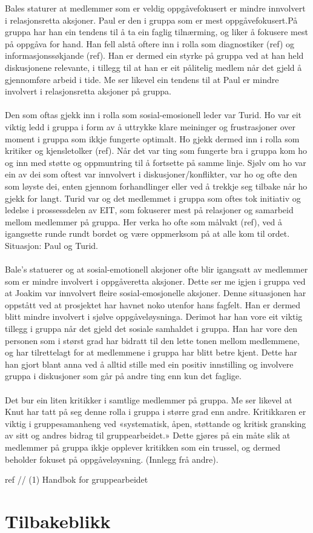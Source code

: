 Bales staturer at medlemmer som er veldig oppgåvefokusert er mindre innvolvert i relasjonsretta aksjoner. Paul er den i gruppa som er mest oppgåvefokusert.På gruppa har han ein tendens til å ta ein faglig tilnærming, og liker å fokusere mest på oppgåva for hand. Han fell alstå oftere inn i rolla som diagnostiker (ref) og informasjonssøkjande (ref). Han er dermed ein styrke på gruppa ved at han held diskusjonene relevante, i tillegg til at han er eit pålitelig medlem når det gjeld å gjennomføre arbeid i tide. Me ser likevel ein tendens til at Paul er mindre involvert i relasjonsretta aksjoner på gruppa. 
\\
\\
Den som oftas gjekk inn i rolla som sosial-emosionell leder var Turid. Ho var eit viktig ledd i gruppa i form av å uttrykke klare meininger og frustrasjoner over moment i gruppa som ikkje fungerte optimalt. Ho gjekk dermed inn i rolla som kritiker og kjensletolker (ref). Når det var ting som fungerte bra i gruppa kom ho og inn med støtte og oppmuntring til å fortsette på samme linje. Sjølv om ho var ein av dei som oftest var innvolvert i diskusjoner/konflikter, var ho og ofte den som løyste dei, enten gjennom forhandlinger eller ved å trekkje seg tilbake når ho gjekk for langt. Turid var og det medlemmet i gruppa som oftes tok initiativ og ledelse i prossessdelen av EIT, som fokuserer mest på relasjoner og samarbeid mellom medlemmer på gruppa. Her verka ho ofte som målvakt (ref), ved å igangsette runde rundt bordet og være oppmerksom på at alle kom til ordet.
Situasjon: Paul og Turid.
\\
\\
Bale's statuerer og at sosial-emotionell aksjoner ofte blir igangsatt av medlemmer som er mindre involvert i oppgåveretta aksjoner. Dette ser me igjen i gruppa ved at Joakim var innvolvert fleire sosial-emosjonelle aksjoner. Denne situasjonen har oppstått ved at prosjektet har havnet noko utenfor hans fagfelt. Han er dermed blitt mindre involvert i sjølve oppgåveløysninga. Derimot har han vore eit viktig tillegg i gruppa når det gjeld det sosiale samhaldet i gruppa. Han har vore den personen som i størst grad har bidratt til den lette tonen mellom medlemmene, og har tilrettelagt for at medlemmene i gruppa har blitt betre kjent. Dette har han gjort blant anna ved å alltid stille med ein positiv innstilling og involvere gruppa i diskusjoner som går på andre ting enn kun det faglige.
\\
\\
Det bur ein liten kritikker i samtlige medlemmer på gruppa. Me ser likevel at Knut har tatt på seg denne rolla i gruppa i større grad enn andre. Kritikkaren er viktig i gruppesamanheng ved «systematisk, åpen, støttande og kritisk gransking av sitt og andres bidrag til gruppearbeidet.»
Dette gjøres på ein måte slik at medlemmer på gruppa ikkje opplever kritikken som ein trussel, og dermed beholder fokuset på oppgåveløysning. (Innlegg frå andre).

ref // (1) Handbok for gruppearbeidet

\section{Tilbakeblikk}

